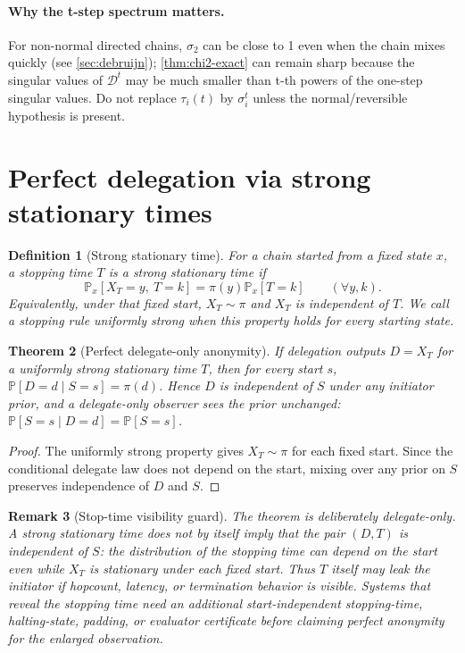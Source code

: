 \documentclass[11pt]{article}
\newtheorem{theorem}{Theorem}[section]
\newtheorem{definition}[theorem]{Definition}
\newtheorem{remark}[theorem]{Remark}
\newcommand{\Prb}{\mathbb{P}}
\newcommand{\cD}{\mathcal{D}}
\begin{document}
\paragraph{Why the t-step spectrum matters.}
For non-normal directed chains, $\sigma_2$ can be close to 1 even when the chain
mixes quickly (see \cref{sec:debruijn}); \cref{thm:chi2-exact} can remain sharp
because the singular values of $\cD^t$ may be much smaller than t-th powers of the
one-step singular values.  Do not replace $\tau_i(t)$ by $\sigma_i^t$ unless the
normal/reversible hypothesis is present.

\section{Perfect delegation via strong stationary times}\label{sec:sst}
\begin{definition}[Strong stationary time]
For a chain started from a fixed state $x$, a stopping time $T$ is a
\emph{strong stationary time} if
\[
\Prb_x[X_T=y,\ T=k]=\pi(y)\Prb_x[T=k]\qquad(\forall y,k).
\]
Equivalently, under that fixed start, $X_T\sim\pi$ and $X_T$ is independent of
$T$.  We call a stopping rule \emph{uniformly strong} when this property holds
for every starting state.
\end{definition}

\begin{theorem}[Perfect delegate-only anonymity]
If delegation outputs $D=X_T$ for a uniformly strong stationary time $T$, then
for every start $s$, $\Prb[D=d\mid S=s]=\pi(d)$.  Hence $D$ is independent
of $S$ under any initiator prior, and a delegate-only observer sees the prior
unchanged: $\Prb[S=s\mid D=d]=\Prb[S=s]$.
\end{theorem}
\begin{proof}
The uniformly strong property gives $X_T\sim\pi$ for each fixed start.  Since
the conditional delegate law does not depend on the start, mixing over any prior
on $S$ preserves independence of $D$ and $S$.
\end{proof}

\begin{remark}[Stop-time visibility guard]
The theorem is deliberately delegate-only.  A strong stationary time does not by
itself imply that the pair $(D,T)$ is independent of $S$: the distribution of the
stopping time can depend on the start even while $X_T$ is stationary under each
fixed start.  Thus $T$ itself may leak the initiator if hopcount, latency, or
termination behavior is visible.  Systems that reveal the stopping time need an
additional start-independent stopping-time, halting-state, padding, or evaluator
certificate before claiming perfect anonymity for the enlarged observation.
\end{remark}
\end{document}
